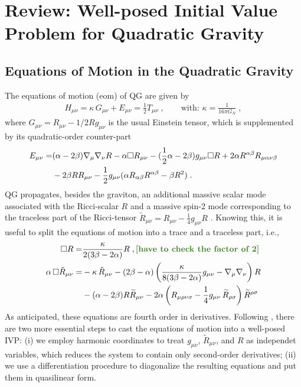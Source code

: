 \documentclass[a4paper,oneside,openany,11pt]{memoir}
\numberwithin{equation}{section} %
\newcommand{\aaron}[1]{{\color{OliveGreen} #1}}
\begin{document}
\section{Review: Well-posed Initial Value Problem for Quadratic Gravity}
\label{sec:well-posedness}

\subsection{Equations of Motion in the Quadratic Gravity}

The equations of motion (eom) of QG are given by
\begin{align}
\label{eq:eom-QG}
	H_{\mu\nu}=\kappa\,G_{\mu\nu} + E_{\mu\nu}=\frac{1}{2}T_{\mu\nu}\;,
	\quad\quad
	\text{with: }\kappa = \frac{1}{16 \pi G_N}\;,
\end{align}
where $G_{\mu\nu} = R_{\mu\nu} -1/2 R g_{\mu\nu}$ is the usual Einstein tensor, which is supplemented by its quadratic-order counter-part
\begin{align}
	E_{\mu\nu} = &(\alpha-2\beta)\nabla_\mu\nabla_\nu R-\alpha \square R_{\mu\nu}-(\frac{1}{2}\alpha-2\beta)g_{\mu\nu}\square R
+2\alpha R^{\alpha\beta}R_{\mu\alpha\nu\beta}
	\notag\\
	&-2\beta R R_{\mu\nu}-\frac{1}{2}g_{\mu\nu}(\alpha R_{\alpha\beta}R^{\alpha\beta}-\beta R^2)\;.
\end{align}
QG propagates, besides the graviton, an additional massive scalar mode associated with the Ricci-scalar $R$ and a massive spin-2 mode corresponding to the traceless part of the Ricci-tensor $\widetilde{R}_{\mu\nu} = R_{\mu\nu} - \frac{1}{4}g_{\mu\nu}R$ \cite{Stelle:1977ry}. Knowing this, it is useful to split the equations of motion into a trace and a traceless part, i.e.,
\begin{align}
	\label{eq:eomForTraceRicci-1}
	\square R = &\frac{\kappa}{2(3\beta-2\alpha)}R\;,
	\textbf{\aaron{[have to check the factor of 2]}}
	\\
	\alpha\,\square \tilde{R}_{\mu\nu} = &-\kappa\,\tilde{R}_{\mu\nu} -(2\beta-\alpha) \left(\frac{\kappa}{8(3\beta-2\alpha)}g_{\mu\nu} -\nabla_\mu\nabla_\nu\right) R 
	\notag\\
	\label{eq:eomForTracelessRicci-1}
	&- (\alpha-2\beta) R\widetilde{R}_{\mu\nu}
	-2\alpha \left(R_{\mu\rho\nu\sigma} -\frac{1}{4} g_{\mu\nu}\, \widetilde{R}_{\rho\sigma}\right) \widetilde{R}^{\rho\sigma}
\end{align}
As anticipated, these equations are fourth order in derivatives.
Following \cite{Noakes:1983}, there are two more essential steps to cast the equations of motion into a well-posed IVP: (i) we employ harmonic coordinates to treat $g_{\mu\nu}$, $\widetilde{R}_{\mu\nu}$, and $R$ as independet variables, which reduces the system to contain only second-order derivatives; (ii) we use a differentiation procedure to diagonalize the resulting equations and put them in quasilinear form.
\end{document}
